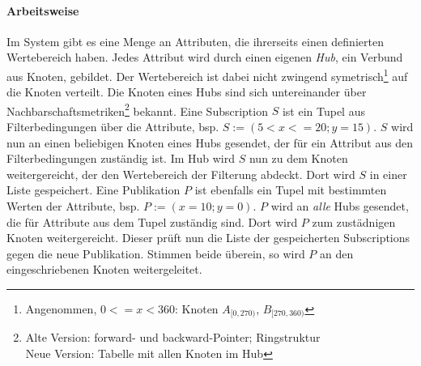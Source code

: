 \paragraph*{Arbeitsweise}
Im System gibt es eine Menge an Attributen, die ihrerseits einen definierten Wertebereich haben. Jedes Attribut wird durch einen eigenen \emph{Hub}, ein Verbund aus Knoten, gebildet. Der Wertebereich ist dabei nicht zwingend symetrisch\footnote{Angenommen, $0<=x<360$: Knoten $A_{[0,270)}$, $B_{[270, 360)}$} auf die Knoten verteilt. Die Knoten eines Hubs sind sich untereinander über Nachbarschaftsmetriken\footnote{Alte Version: forward- und backward-Pointer; Ringstruktur\\Neue Version: Tabelle mit allen Knoten im Hub} bekannt.
Eine Subscription $S$ ist ein Tupel aus Filterbedingungen über die Attribute, bsp. $S := (5 < x <= 20; y = 15)$. $S$ wird nun an einen beliebigen Knoten eines Hubs gesendet, der für ein Attribut aus den Filterbedingungen zuständig ist. Im Hub wird $S$ nun zu dem Knoten weitergereicht, der den Wertebereich der Filterung abdeckt. Dort wird $S$ in einer Liste gespeichert.
Eine Publikation $P$ ist ebenfalls ein Tupel mit bestimmten Werten der Attribute, bsp. $P := (x = 10; y = 0)$. $P$ wird an \emph{alle} Hubs gesendet, die für Attribute aus dem Tupel zuständig sind. Dort wird $P$ zum zustädnigen Knoten weitergereicht. Dieser prüft nun die Liste der gespeicherten Subscriptions gegen die neue Publikation. Stimmen beide überein, so wird $P$ an den eingeschriebenen Knoten weitergeleitet.


\cite{BeFiMu2006PubSubQoS}


\cite{KostasKatrinis2005}
